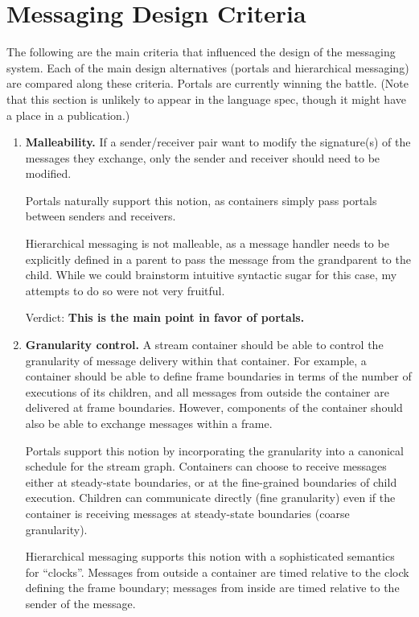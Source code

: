 \section{Messaging Design Criteria}

The following are the main criteria that influenced the design of the
messaging system.  Each of the main design alternatives (portals and
hierarchical messaging) are compared along these criteria.  Portals
are currently winning the battle.  (Note that this section is unlikely
to appear in the language spec, though it might have a place in a
publication.)

\begin{enumerate}

\item {\bf Malleability.}  If a sender/receiver pair want to modify
the signature(s) of the messages they exchange, only the sender and
receiver should need to be modified.

Portals naturally support this notion, as containers simply pass
portals between senders and receivers.

Hierarchical messaging is not malleable, as a message handler
needs to be explicitly defined in a parent to pass the message from
the grandparent to the child.  While we could brainstorm intuitive
syntactic sugar for this case, my attempts to do so were not very
fruitful.

Verdict: {\bf This is the main point in favor of portals.}

\item {\bf Granularity control.}  A stream container should be able to
control the granularity of message delivery within that container.
For example, a container should be able to define frame boundaries in
terms of the number of executions of its children, and all messages
from outside the container are delivered at frame boundaries.
However, components of the container should also be able to exchange
messages within a frame.

Portals support this notion by incorporating the granularity into a
canonical schedule for the stream graph.  Containers can choose to
receive messages either at steady-state boundaries, or at the
fine-grained boundaries of child execution.  Children can communicate
directly (fine granularity) even if the container is receiving
messages at steady-state boundaries (coarse granularity).

Hierarchical messaging supports this notion with a sophisticated
semantics for ``clocks''.  Messages from outside a container are timed
relative to the clock defining the frame boundary; messages from
inside are timed relative to the sender of the message.


\end{enumerate}
